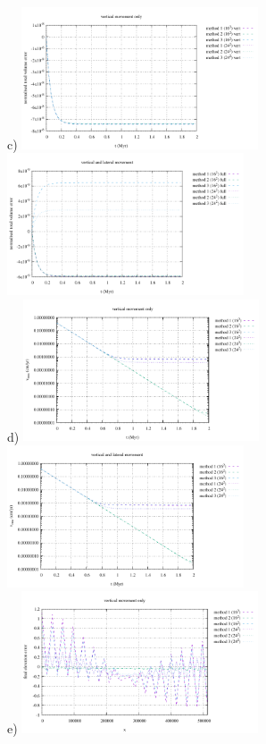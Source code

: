 \begin{center}
c) \includegraphics[width=7cm]{python_codes/fieldstone_54/images/volume_vert.pdf}
\includegraphics[width=7cm]{python_codes/fieldstone_54/images/volume_full.pdf}\\
d) \includegraphics[width=7cm]{python_codes/fieldstone_54/images/vrms_vert.pdf}
\includegraphics[width=7cm]{python_codes/fieldstone_54/images/vrms_full.pdf}\\
e) \includegraphics[width=7cm]{python_codes/fieldstone_54/images/surface_topography_200_vert.pdf}

\end{center}
